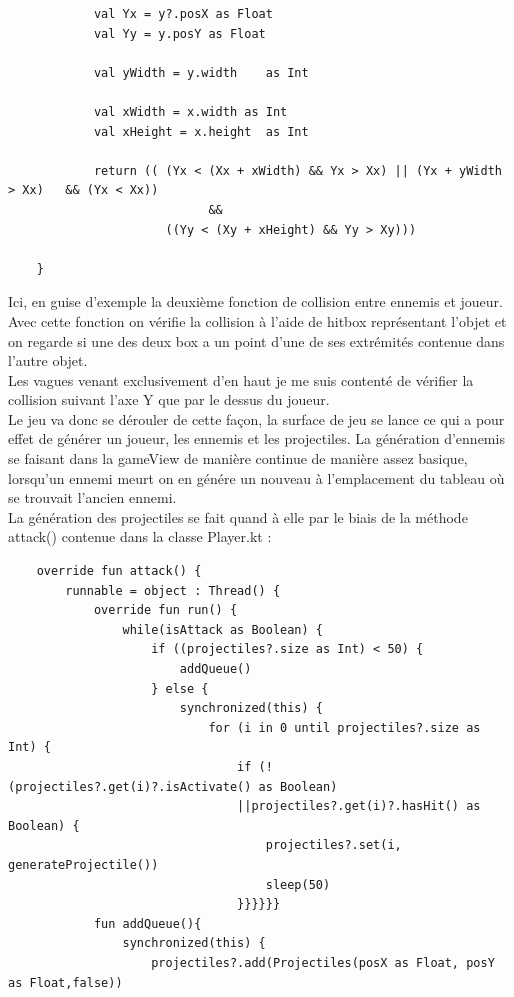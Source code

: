 \documentclass{article}
\begin{document}
\begin{itemize}
\begin{verbatim}
            val Yx = y?.posX as Float
            val Yy = y.posY as Float

            val yWidth = y.width    as Int

            val xWidth = x.width as Int
            val xHeight = x.height  as Int

            return (( (Yx < (Xx + xWidth) && Yx > Xx) || (Yx + yWidth > Xx)   && (Yx < Xx))
                            &&
                      ((Yy < (Xy + xHeight) && Yy > Xy)))
                    
    }
    \end{verbatim}
    Ici, en guise d'exemple la deuxième fonction de collision entre ennemis et joueur. \\ 
    Avec cette fonction on vérifie la collision à l'aide de hitbox représentant l'objet et on regarde si une des deux box a un point d'une de ses extrémités contenue dans l'autre objet.\\ 
    Les vagues venant exclusivement d'en haut je me suis contenté de vérifier la collision suivant l'axe Y que par le dessus du joueur.\\ 
    Le jeu va donc se dérouler de cette façon, la surface de jeu se lance ce qui a pour effet de générer un joueur, les ennemis et les projectiles. La génération d'ennemis se faisant dans la gameView de manière continue de manière assez basique, lorsqu'un ennemi meurt on en génére un nouveau à l'emplacement du tableau où se trouvait l'ancien ennemi. \\ 
    La génération des projectiles se fait quand à elle par le biais de la méthode attack() contenue dans la classe Player.kt : 
    \begin{verbatim}
    override fun attack() {
        runnable = object : Thread() {
            override fun run() {
                while(isAttack as Boolean) {
                    if ((projectiles?.size as Int) < 50) {
                        addQueue()
                    } else {
                        synchronized(this) {
                            for (i in 0 until projectiles?.size as Int) {
                                if (!(projectiles?.get(i)?.isActivate() as Boolean) 
                                ||projectiles?.get(i)?.hasHit() as Boolean) {
                                    projectiles?.set(i, generateProjectile())
                                    sleep(50)
                                }}}}}}
            fun addQueue(){
                synchronized(this) {
                    projectiles?.add(Projectiles(posX as Float, posY as Float,false))

\end{verbatim}
\end{itemize}
\end{document}
